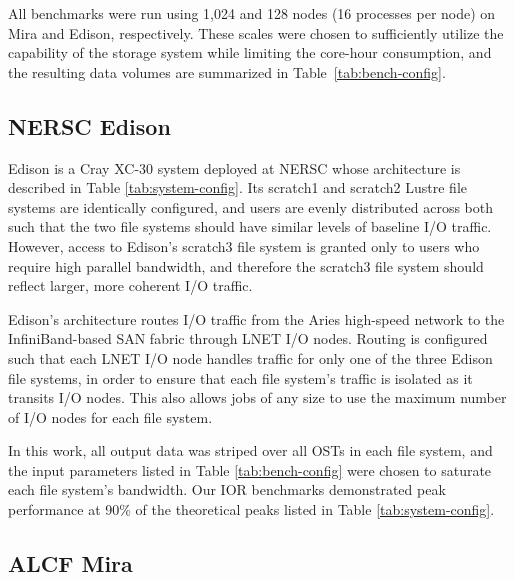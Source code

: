 All benchmarks were run using 1,024 and 128 nodes (16 processes per node) on Mira and Edison, respectively.
These scales were chosen to sufficiently utilize the capability of the storage system while limiting the core-hour consumption,
and the resulting data volumes are summarized in Table~\ref{tab:bench-config}.



\subsection{NERSC Edison} \label{sec:platforms/edison}

Edison is a Cray XC-30 system deployed at NERSC whose architecture is described in Table \ref{tab:system-config}.
Its scratch1 and scratch2 Lustre file systems are identically configured, and users are evenly distributed across both such that the two file systems should have similar levels of baseline I/O traffic.
However, access to Edison's scratch3 file system is granted only to users who require high parallel bandwidth, and therefore the scratch3 file system should reflect larger, more coherent I/O traffic.

Edison's architecture routes I/O traffic from the Aries high-speed network to the InfiniBand-based SAN fabric through LNET I/O nodes.
Routing is configured such that each LNET I/O node handles traffic for only one of the three Edison file systems, in order to ensure that each file system's traffic is isolated as it transits I/O nodes.
This also allows jobs of any size to use the maximum number of I/O nodes for each file system.

In this work, all output data was striped over all OSTs in each file system, and the input parameters listed in Table \ref{tab:bench-config} were chosen to saturate each file system's bandwidth.
Our IOR benchmarks demonstrated peak performance at 90\% of the theoretical peaks listed in Table \ref{tab:system-config}.

\subsection{ALCF Mira} \label{sec:platforms/mira}

